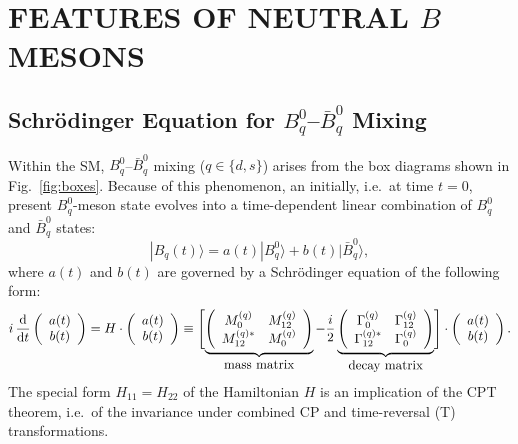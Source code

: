 \documentclass[12pt]{article}
\begin{document}
\section{FEATURES OF NEUTRAL {\boldmath$B$\unboldmath} 
MESONS}\label{sec:mix}
\setcounter{equation}{0}
%
%
%
\boldmath\subsection{Schr\"odinger Equation for $B^0_q$--$\bar B^0_q$ 
Mixing}\unboldmath\label{ssec:BBbar-mix}
%
%
%
Within the SM, $B^0_q$--$\bar B^0_q$ mixing ($q\in\{d,s\}$) arises from
the box diagrams shown in Fig.~\ref{fig:boxes}. Because of
this phenomenon, an initially, i.e.\ at time $t=0$, present 
$B^0_q$-meson state evolves into a time-dependent linear combination of 
$B^0_q$ and $\bar B^0_q$ states:
\begin{equation}
|B_q(t)\rangle=a(t)|B^0_q\rangle + b(t)|\bar B^0_q\rangle,
\end{equation}
where $a(t)$ and $b(t)$ are governed by a Schr\"odinger equation of 
the following form:
\begin{equation}\label{SG-OSZ}
i\,\frac{{\rm d}}{{\rm d} t}\left(\begin{array}{c} a(t)\\ b(t)
\end{array}
\right)= H \cdot\left(\begin{array}{c}
a(t)\\ b(t)\nonumber
\end{array}
\right) \equiv
\Biggl[\underbrace{\left(\begin{array}{cc}
M_{0}^{(q)} & M_{12}^{(q)}\\ M_{12}^{(q)\ast} & M_{0}^{(q)}
\end{array}\right)}_{\mbox{mass matrix}}-
\frac{i}{2}\underbrace{\left(\begin{array}{cc}
\Gamma_{0}^{(q)} & \Gamma_{12}^{(q)}\\
\Gamma_{12}^{(q)\ast} & \Gamma_{0}^{(q)}
\end{array}\right)}_{\mbox{decay matrix}}\Biggr]
\cdot\left(\begin{array}{c}
a(t)\\ b(t)\nonumber
\end{array}
\right).
\end{equation}
The special form $H_{11}=H_{22}$ of the Hamiltonian $H$ is an implication 
of the CPT theorem, i.e.\ of the invariance under combined CP and 
time-reversal (T) transformations. 
\end{document}
